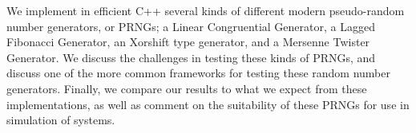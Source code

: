 We implement in efficient C++ several kinds of different modern pseudo-random number generators, or PRNGs; a Linear Congruential Generator, a Lagged Fibonacci Generator, an Xorshift type generator, and a Mersenne Twister Generator. We discuss the challenges in testing these kinds of PRNGs, and discuss one of the more common frameworks for testing these random number generators. Finally, we compare our results to what we expect from these implementations, as well as comment on the suitability of these PRNGs for use in simulation of systems.
